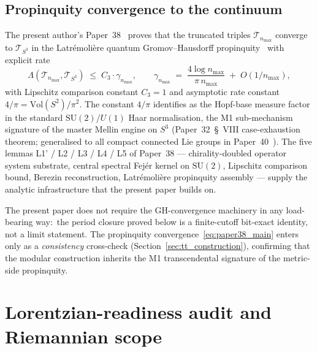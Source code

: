 \documentclass[11pt,a4paper]{article}
\theoremstyle{plain}
\theoremstyle{definition}
\newcommand{\nmax}{n_{\max}}
\newcommand{\sthree}{S^{3}}
\newcommand{\Tcal}{\mathcal{T}}
\newcommand{\SU}{\mathrm{SU}}
\newcommand{\Vol}{\mathrm{Vol}}
\begin{document}
\subsection{Propinquity convergence to the continuum}
\label{sec:propinquity_recap}

The present author's Paper~38~\cite{paper38} proves that the
truncated triples $\Tcal_{\nmax}$ converge to $\Tcal_{\sthree}$ in the
Latr\'emoli\`ere quantum Gromov--Hausdorff
propinquity~\cite{latremoliere_metric_st_2017} with explicit rate
\begin{equation}\label{eq:paper38_main}
   \Lambda(\Tcal_{\nmax}, \Tcal_{\sthree})
   \;\le\; C_3 \cdot \gamma_{\nmax},
   \qquad
   \gamma_{\nmax} \;=\; \frac{4 \log \nmax}{\pi \, \nmax}
                       \;+\; O(1/\nmax),
\end{equation}
with Lipschitz comparison constant $C_3 = 1$ and asymptotic rate
constant $4/\pi = \Vol(S^2)/\pi^2$. The constant $4/\pi$ identifies as
the Hopf-base measure factor in the standard $\SU(2)/U(1)$ Haar
normalisation, the M1 sub-mechanism signature of the master Mellin
engine on $\sthree$ (Paper~32~\S~VIII case-exhaustion theorem;
generalised to all compact connected Lie groups in
Paper~40~\cite{paper40_unified}). The five lemmas L1' / L2 / L3 / L4 /
L5 of Paper~38 — chirality-doubled operator system substrate, central
spectral Fej\'er kernel on $\SU(2)$, Lipschitz comparison bound,
Berezin reconstruction, Latr\'emoli\`ere propinquity assembly — supply
the analytic infrastructure that the present paper builds on.

The present paper does not require the GH-convergence machinery in any
load-bearing way:\ the period closure proved below is a
finite-cutoff bit-exact identity, not a limit statement. The
propinquity convergence~\eqref{eq:paper38_main} enters only as a
\emph{consistency} cross-check (Section~\ref{sec:tt_construction}),
confirming that the modular construction inherits the M1 transcendental
signature of the metric-side propinquity.

\section{Lorentzian-readiness audit and Riemannian scope}
\label{sec:lorentzian_readiness}
\end{document}
